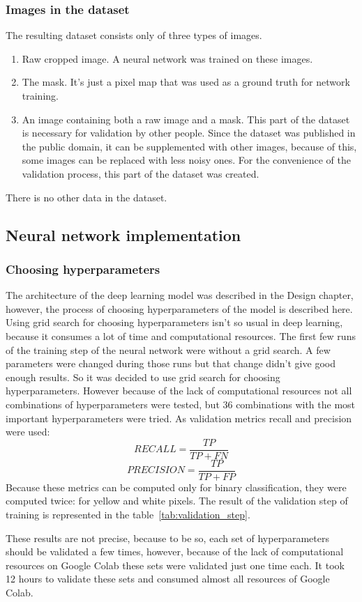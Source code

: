 \subsubsection{Images in the dataset}
The resulting dataset consists only of three types of images. 
\begin{enumerate}
    \item Raw cropped image. A neural network was trained on these images.
    \item The mask. It's just a pixel map that was used as a ground truth for network training. 
    \item An image containing both a raw image and a mask. This part of the dataset is necessary for validation by other people. Since the dataset was published 
    in the public domain, it can be supplemented with other images, because of this, some images can be replaced with less noisy ones. For the convenience of the 
    validation process, this part of the dataset was created.
\end{enumerate}
There is no other data in the dataset.

\subsection{Neural network implementation}
\subsubsection{Choosing hyperparameters}
The architecture of the deep learning model was described in the Design chapter, however, the process of choosing hyperparameters of the model is described here.
Using grid search for choosing hyperparameters isn't so usual in deep learning, because it consumes a lot of time and computational resources. 
The first few runs of the training step of the neural network were without a grid search. A few parameters were changed during those runs but that change didn't give
good enough results. So it was decided to use grid search for choosing hyperparameters. However because of the lack of computational resources not all combinations of 
hyperparameters were tested, but 36 combinations with the most important hyperparameters were tried. As validation metrics recall and precision were used:
\[RECALL = \frac{TP}{TP + FN}\]
\[PRECISION = \frac{TP}{TP + FP}\] 
Because these metrics can be computed only for binary classification, they were computed twice: for yellow and white pixels.
The result of the validation step of training is represented in the table~\ref{tab:validation_step}.

These results are not precise, because to be so, each set of hyperparameters should be validated a few times, however, because of the lack 
of computational resources on Google Colab these sets were validated just one time each. It took 12 hours to validate these sets and consumed almost all resources of 
Google Colab.

